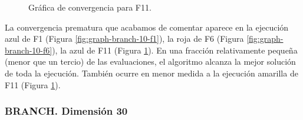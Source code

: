 \documentclass{article}
\begin{document}
\begin{figure}[H]
	\centering
	\caption{Gráfica de convergencia para F11.}
	\label{fig:graph-branch-10-f11}
\end{figure}

La convergencia prematura que acabamos de comentar aparece en la ejecución azul de F1 (Figura \ref{fig:graph-branch-10-f1}), la roja de F6
(Figura \ref{fig:graph-branch-10-f6}), la azul de F11 (Figura \ref{fig:graph-branch-10-f11}). En una fracción relativamente pequeña (menor que
un tercio) de las evaluaciones, el algoritmo alcanza la mejor solución de toda la ejecución. También ocurre en menor medida a la ejecución
 amarilla de F11 (Figura \ref{fig:graph-branch-10-f11}).

\subsubsection*{BRANCH. Dimensión 30}
\end{document}
